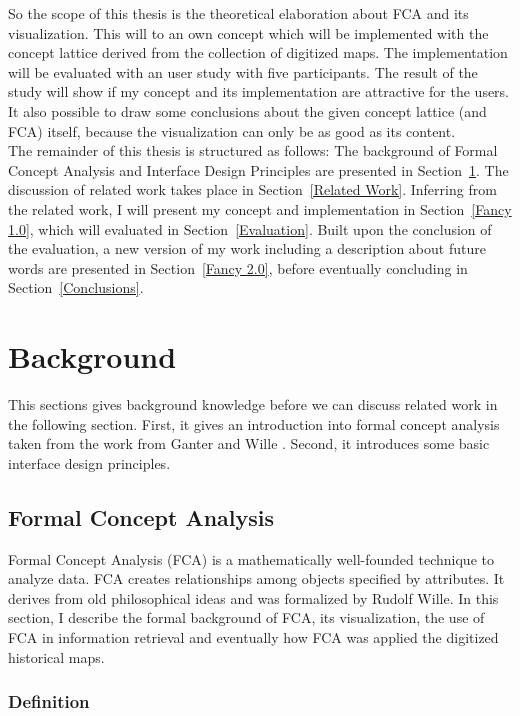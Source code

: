 \documentclass[11pt]{report}
\begin{document}
So the scope of this thesis is the theoretical elaboration about FCA and its visualization. This will to an own concept which will be implemented with the concept lattice derived from the collection of digitized maps. The implementation will be evaluated with an user study with five participants. The result of the study will show if my concept and its implementation are attractive for the users. It also possible to draw some conclusions about the given concept lattice (and FCA) itself, because the visualization can only be as good as its content.\\

 The remainder of this thesis is structured as follows: The background of Formal Concept Analysis and Interface Design Principles are presented in Section~\ref{Background}. The discussion of related work takes place in Section~\ref{Related Work}. Inferring from the related work, I will present my concept  and implementation in Section~\ref{Fancy 1.0}, which will evaluated in Section~\ref{Evaluation}. Built upon the conclusion of the evaluation, a new version of my work including a description about future words are presented in Section~\ref{Fancy 2.0}, before eventually concluding in Section~\ref{Conclusions}.
 
\chapter{Background}
\label{Background}

This sections gives background knowledge before we can discuss related work in the following section. First, it gives an introduction into formal concept analysis taken from the work from Ganter and Wille \cite{Ganter2012}. Second, it introduces some basic interface design principles.

\section{Formal Concept Analysis}
\label{Formal Concept Analysis}

Formal Concept Analysis (FCA) is a mathematically well-founded technique to analyze data. FCA creates relationships among objects specified by attributes. It derives from old philosophical ideas and was formalized by Rudolf Wille. In this section, I describe the formal background of FCA, its visualization, the use of FCA in information retrieval and eventually how FCA was applied the digitized historical maps.

\subsection{Definition}
\end{document}
